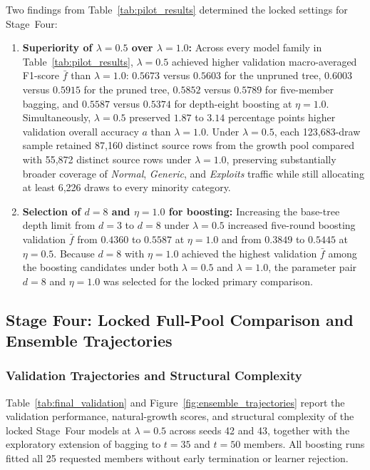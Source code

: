 Two findings from Table~\ref{tab:pilot_results} determined the locked settings for Stage~Four:
\begin{enumerate}
    \item \textbf{Superiority of $\lambda = 0.5$ over $\lambda = 1.0$:} Across every model family in Table~\ref{tab:pilot_results}, $\lambda = 0.5$ achieved higher validation macro-averaged F1-score $\bar{f}$ than $\lambda = 1.0$: $0.5673$ versus $0.5603$ for the unpruned tree, $0.6003$ versus $0.5915$ for the pruned tree, $0.5852$ versus $0.5789$ for five-member bagging, and $0.5587$ versus $0.5374$ for depth-eight boosting at $\eta = 1.0$. Simultaneously, $\lambda = 0.5$ preserved $1.87$ to $3.14$ percentage points higher validation overall accuracy $a$ than $\lambda = 1.0$. Under $\lambda = 0.5$, each 123,683-draw sample retained 87,160 distinct source rows from the growth pool compared with 55,872 distinct source rows under $\lambda = 1.0$, preserving substantially broader coverage of \emph{Normal}, \emph{Generic}, and \emph{Exploits} traffic while still allocating at least 6,226 draws to every minority category.
    \item \textbf{Selection of $d = 8$ and $\eta = 1.0$ for boosting:} Increasing the base-tree depth limit from $d = 3$ to $d = 8$ under $\lambda = 0.5$ increased five-round boosting validation $\bar{f}$ from $0.4360$ to $0.5587$ at $\eta = 1.0$ and from $0.3849$ to $0.5445$ at $\eta = 0.5$. Because $d = 8$ with $\eta = 1.0$ achieved the highest validation $\bar{f}$ among the boosting candidates under both $\lambda = 0.5$ and $\lambda = 1.0$, the parameter pair $d = 8$ and $\eta = 1.0$ was selected for the locked primary comparison.
\end{enumerate}

\subsection{Stage Four: Locked Full-Pool Comparison and Ensemble Trajectories}
\label{subsec:res_stage4}

\subsubsection{Validation Trajectories and Structural Complexity}
Table~\ref{tab:final_validation} and Figure~\ref{fig:ensemble_trajectories} report the validation performance, natural-growth scores, and structural complexity of the locked Stage~Four models at $\lambda = 0.5$ across seeds 42 and 43, together with the exploratory extension of bagging to $t = 35$ and $t = 50$ members. All boosting runs fitted all 25 requested members without early termination or learner rejection.

